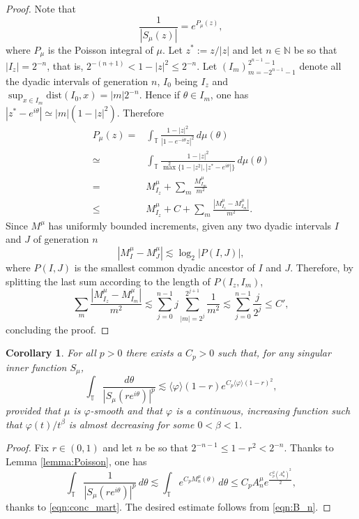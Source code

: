 \documentclass{birkjour}
\numberwithin{equation}{section}
\theoremstyle{plain}
\newtheorem{coro}[theo]{Corollary}
\theoremstyle{definition}
\newcommand{\T}{\mathbb{T}}
\newcommand{\N}{\mathbb{N}}
\newcommand{\1}{\mathds{1}}
\newcommand{\charphi}{\langle \varphi\rangle}
\newcommand{\dist}{\mathrm{dist}}
\begin{document}
\begin{proof}
Note that 
\[
\frac{1}{|S_\mu(z)|}=e^{P_\mu(z)},
\]
where $P_\mu$ is the Poisson integral of $\mu$. Let $z^*:=z/|z|$ and let $n\in\N$ be so that $|I_z|=2^{-n}$, that is, $2^{-(n+1)}<1-|z|^2\leq 2^{-n}$. Let $(I_m)_{m=-2^{n-1}-1}^{2^{n-1}-1}$ denote all the dyadic intervals of generation $n$, $I_0$ being $I_z$ and $\sup_{x \in I_m}
 \dist(I_0, x)=|m|2^{-n}$. Hence if $\theta\in I_m$, one has $|z^*-e^{i\theta}|\simeq |m|(1-|z|^2)$. Therefore
\[
\begin{split}
P_\mu(z)=&\int_\T\frac{1-|z|^2}{|1-e^{-i\theta}z|^2}\,d\mu(\theta)\\
\simeq&\int_\T\frac{1-|z|^2}{\max^2\{1-|z^2|, |z^*-e^{i\theta}|\}}\,d\mu(\theta)\\
=& M^\mu_{I_z}+\sum_{m}\frac{M^\mu_{I_m}}{m^2}\\
\leq& M^\mu_{I_z}+C+\sum_m\frac{|M^\mu_{I_z}-M^\mu_{I_m}|}{m^2}.
\end{split}
\]
Since $M^\mu$ has uniformly bounded increments, given any two dyadic intervals $I$ and $J$ of generation $n$ 
\[
|M^\mu_I-M^\mu_J|\lesssim\log_2|P(I, J)|,
\]
where $P(I, J)$ is the smallest common dyadic ancestor of $I$ and $J$. Therefore, by splitting the last sum according to the length of $P(I_z, I_m)$, 
\[
\sum_m\frac{|M^\mu_{I_z}-M^\mu_{I_m}|}{m^2}\lesssim\sum_{j=0}^{n-1}j\sum_{|m|=2^{j}}^{2^{j+1}}\frac{1}{m^2}\lesssim\sum_{j=0}^{n-1}\frac{j}{2^j}\leq C',
\]
concluding the proof.
\end{proof}
\begin{coro}
    \label{coro:means}
    For all $p>0$ there exists a $C_p>0$ such that, for any singular inner function $S_\mu$,
    \[
    \int_\T\frac{d\theta}{|S_\mu(re^{i\theta})|^p}\lesssim\charphi(1-r)e^{C_p\charphi(1-r)^2}, 
    \]
    provided that $\mu$ is $\varphi$-smooth and that $\varphi$ is a continuous, increasing function such that $\varphi(t)/t^\beta$ is almost decreasing for some $0<\beta<1$.
\end{coro}
\begin{proof}
Fix $r\in(0, 1)$ and let $n$ be so that $2^{-n-1}\le1-r^2<2^{-n}$. Thanks to Lemma \ref{lemma:Poisson}, one has
\[
\int_\T\frac{1}{|S_\mu(re^{i\theta})|^p}\,d\theta\lesssim\int_\T e^{C_p M^\mu_{n}(\theta)}\,d\theta\leq C_p A^\mu_ne^\frac{C_p^2\left(A^\mu_n\right)^2}{2},
\]
thanks to \eqref{eqn:conc_mart}. The desired estimate follows from \eqref{eqn:B_n}.
\end{proof}
\end{document}
